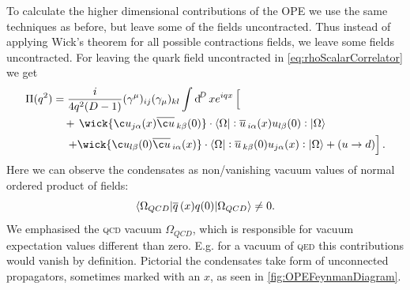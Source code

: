 \documentclass[../../index.tex]{subfiles}
\begin{document}
To calculate the higher dimensional contributions of the OPE we use the same
techniques as before, but leave some of the fields uncontracted. Thus instead of
applying Wick's theorem for all possible contractions fields, we leave some
fields uncontracted. For leaving the quark field uncontracted in
\cref{eq:rhoScalarCorrelator} we get
\begin{equation}
  \begin{split}
    \Pi(q^2) &= \frac{i}{4q^2(D-1)} (\gamma^\mu)_{ij} (\gamma_\mu)_{kl} \int \dif^D x e^{iqx} \left[ \phantom{\wick{ \c u_{j \alpha}(x) \anti{\c u}_{k \beta}(0)}} \right.\\
    &\quad+\,\wick{ \c u_{j \alpha}(x) \anti{\c u}_{k \beta}(0)} \cdot \langle \Omega \vert : \anti{u}_{i \alpha}(x) u_{l \beta} (0) :\vert \Omega \rangle \\
    &\quad\,\left.+\wick{\c u_{l \beta}(0) \anti{\c u}_{i \alpha}(x)} \cdot
      \langle \Omega \vert: \anti{u}_{k \beta}(0) u_{j \alpha}(x) : \vert \Omega
      \rangle + (u \to d) \right].
  \end{split}
\end{equation}
Here we can observe the condensates as non\-/vanishing vacuum values of normal
ordered product of fields:
\begin{equation}
  \langle\Omega_{QCD}\vert \overline{q}\,(x) q(0) \vert\Omega_{QCD}\rangle \neq 0.
\end{equation}
We emphasised the \textsc{qcd} vacuum \(\Omega_{QCD}\), which is responsible for
vacuum expectation values different than zero. E.g. for a vacuum of \textsc{qed}
this contributions would vanish by definition. Pictorial the condensates take
form of unconnected propagators, sometimes marked with an \(x\), as seen in
\cref{fig:OPEFeynmanDiagram}.
\end{document}
